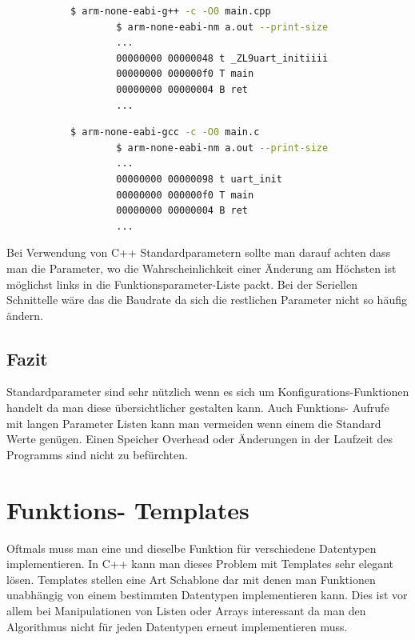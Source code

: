 \documentclass[MES,Master,ngerman]{twbook}%
\begin{document}
\begin{figure}[!htb]
	\begin{subfigure}[b]{0.5\textwidth}
		\begin{lstlisting}[gobble=6, title={Analyse C++}, language=bash, numbers=none]
		$ arm-none-eabi-g++ -c -O0 main.cpp
		$ arm-none-eabi-nm a.out --print-size
		...
		00000000 00000048 t _ZL9uart_initiiii
		00000000 000000f0 T main
		00000000 00000004 B ret
		...
		\end{lstlisting}
	\end{subfigure}
	\begin{subfigure}[b]{0.5\textwidth}
		\begin{lstlisting}[gobble=6, title={Analyse C}, language=bash, numbers=none]
		$ arm-none-eabi-gcc -c -O0 main.c
		$ arm-none-eabi-nm a.out --print-size
		...
		00000000 00000098 t uart_init
		00000000 000000f0 T main
		00000000 00000004 B ret
		...
		\end{lstlisting}
	\end{subfigure}
\end{figure}
Bei Verwendung von C++ Standardparametern sollte man darauf achten dass man die Parameter, wo die Wahrscheinlichkeit einer Änderung am Höchsten ist möglichst links in die Funktionsparameter-Liste packt. Bei der Seriellen Schnittelle wäre das die Baudrate da sich die restlichen Parameter nicht so häufig ändern.  

\subsection{Fazit}
Standardparameter sind sehr nützlich wenn es sich um Konfigurations-Funktionen handelt da man diese übersichtlicher gestalten kann. Auch Funktions- Aufrufe mit langen Parameter Listen kann man vermeiden wenn einem die Standard Werte genügen. Einen Speicher Overhead oder Änderungen in der Laufzeit des Programms sind nicht zu befürchten.

\newpage

\section{Funktions- Templates}
Oftmals muss man eine und dieselbe Funktion für verschiedene Datentypen implementieren. In C++ kann man dieses Problem mit Templates sehr elegant lösen. Templates stellen eine Art Schablone dar mit denen man Funktionen unabhängig von einem bestimmten Datentypen implementieren kann. Dies ist vor allem bei Manipulationen von Listen oder Arrays interessant da man den Algorithmus nicht für jeden Datentypen erneut implementieren muss.
\end{document}
